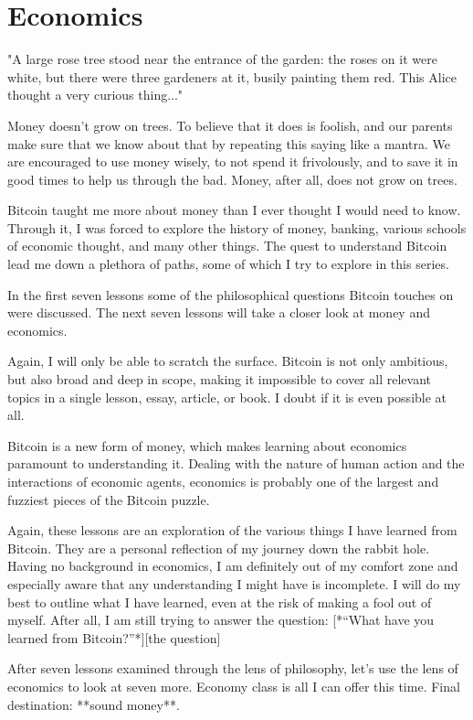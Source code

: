 \chapter{Economics}
\label{ch:economics}

"A large rose tree stood near the entrance of the garden: the roses on it were white, but there were three gardeners at it, busily painting them red. This Alice thought a very curious thing..."

Money doesn’t grow on trees. To believe that it does is foolish, and our
parents make sure that we know about that by repeating this saying like a
mantra. We are encouraged to use money wisely, to not spend it frivolously,
and to save it in good times to help us through the bad. Money, after all,
does not grow on trees.

Bitcoin taught me more about money than I ever thought I would need to know.
Through it, I was forced to explore the history of money, banking, various
schools of economic thought, and many other things. The quest to understand
Bitcoin lead me down a plethora of paths, some of which I try to explore in
this series.

In the first seven lessons some of the philosophical questions Bitcoin touches
on were discussed. The next seven lessons will take a closer look at money and
economics.


Again, I will only be able to scratch the surface. Bitcoin is not only
ambitious, but also broad and deep in scope, making it impossible to cover all
relevant topics in a single lesson, essay, article, or book. I  doubt if it is
even possible at all.

Bitcoin is a new form of money, which makes learning about economics paramount
to understanding it. Dealing with the nature of human action and the
interactions of economic agents, economics is probably one of the largest and
fuzziest pieces of the Bitcoin puzzle.

Again, these lessons are an exploration of the various things I have learned
from Bitcoin. They are a personal reflection of my journey down the rabbit hole.
Having no background in economics, I am definitely out of my comfort zone and
especially aware that any understanding I might have is incomplete. I will do my
best to outline what I have learned, even at the risk of making a fool out of
myself. After all, I am still trying to answer the question: [*“What have you
learned from Bitcoin?”*][the question]

After seven lessons examined through the lens of philosophy, let’s use the lens
of economics to look at seven more. Economy class is all I can offer this time.
Final destination: **sound money**.


